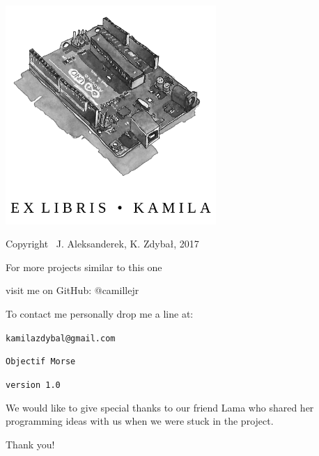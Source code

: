 \documentclass[12pt]{report}
\begin{document}

\thispagestyle{empty}
\begin{center}
    
\vspace*{4cm}

\includegraphics[width = 80mm]{ex_libris_arduino.png}

\vspace*{2cm}

Copyright \textcopyright \, J. Aleksanderek, K. Zdybał, 2017

For more projects similar to this one

visit me on GitHub: @camillejr

To contact me personally drop me a line at:

\verb|kamilazdybal@gmail.com|

\vspace*{2cm}

\verb|Objectif Morse|

\verb|version 1.0|
\end{center}
\newpage

\setlength{\parskip}{1em}
\renewcommand{\baselinestretch}{1.0}

\thispagestyle{empty}
\begin{center}
    
\vspace*{2.5cm}

{\selectfont
We would like to give special thanks to our friend Lama who shared her programming ideas with us when we were stuck in the project.

Thank you!
}
\vspace*{2cm}

\end{center}
\end{document}
